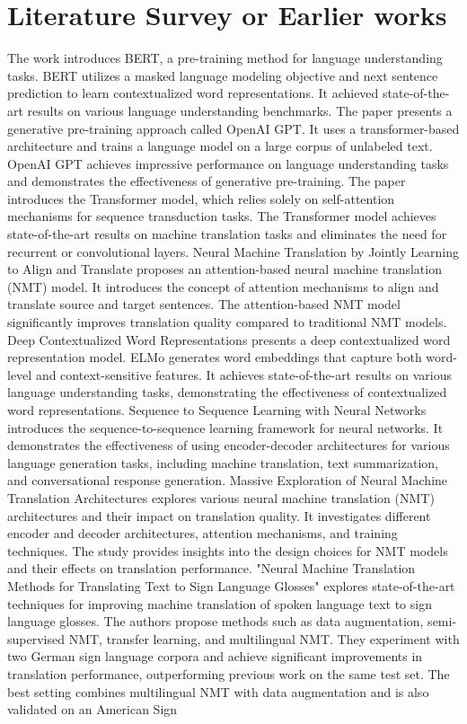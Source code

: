 \section{Literature Survey or Earlier works} \label{sec: literature survey}

 The work \cite{DBLP} introduces BERT, a pre-training method for language understanding tasks. BERT utilizes a masked language modeling objective and next sentence prediction to learn contextualized word representations. It achieved state-of-the-art results on various language understanding benchmarks. The paper \cite{gen_pretrain} presents a generative pre-training approach called OpenAI GPT. It uses a transformer-based architecture and trains a language model on a large corpus of unlabeled text. OpenAI GPT achieves impressive performance on language understanding tasks and demonstrates the effectiveness of generative pre-training. The paper \cite{attention} introduces the Transformer model, which relies solely on self-attention mechanisms for sequence transduction tasks. The Transformer model achieves state-of-the-art results on machine translation tasks and eliminates the need for recurrent or convolutional layers. Neural Machine Translation by Jointly Learning to Align and Translate \cite{nmt} proposes an attention-based neural machine translation (NMT) model. It introduces the concept of attention mechanisms to align and translate source and target sentences. The attention-based NMT model significantly improves translation quality compared to traditional NMT models. Deep Contextualized Word Representations \cite{word_reps} presents a deep contextualized word representation model. ELMo generates word embeddings that capture both word-level and context-sensitive features. It achieves state-of-the-art results on various language understanding tasks, demonstrating the effectiveness of contextualized word representations. Sequence to Sequence Learning with Neural Networks \cite{seq_to_seq} introduces the sequence-to-sequence learning framework for neural networks. It demonstrates the effectiveness of using encoder-decoder architectures for various language generation tasks, including machine translation, text summarization, and conversational response generation. Massive Exploration of Neural Machine Translation Architectures \cite{massive_nmt} explores various neural machine translation (NMT) architectures and their impact on translation quality. It investigates different encoder and decoder architectures, attention mechanisms, and training techniques. The study provides insights into the design choices for NMT models and their effects on translation performance. "Neural Machine Translation Methods for Translating Text to Sign Language Glosses" \cite{base_paper} explores state-of-the-art techniques for improving machine translation of spoken language text to sign language glosses. The authors propose methods such as data augmentation, semi-supervised NMT, transfer learning, and multilingual NMT. They experiment with two German sign language corpora and achieve significant improvements in translation performance, outperforming previous work on the same test set. The best setting combines multilingual NMT with data augmentation and is also validated on an American Sign 